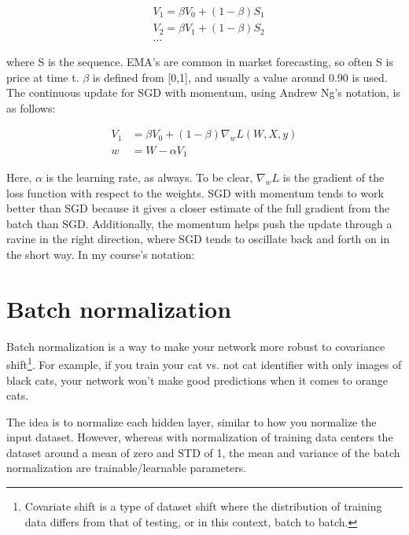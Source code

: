 \begin{align}
    & V_1 = \beta V_0 + \left(1 - \beta \right) S_1 \\
    & V_2 = \beta V_1 + \left(1 - \beta \right) S_2 \\
    & ...
\end{align}

\noindent where S is the sequence. EMA's are common in market forecasting, so often S is price at time t.
$ \beta $ is defined from [0,1], and usually a value around 0.90 is used. The continuous update for SGD with momentum, using Andrew Ng's notation, is as follows:

\begin{align}
    V_1 &= \beta V_0  + \left( 1 - \beta \right) \nabla_w L \left( W, X, y \right)\\
    w &= W - \alpha V_1
\end{align}


Here, $ \alpha $  is the learning rate, as always. To be clear, $\nabla_w L$ is the gradient of the loss function with respect to the weights. SGD with momentum tends to work better than SGD because it gives a closer estimate of the full gradient from the batch than SGD. Additionally, the momentum helps push the update through a ravine in the right direction, where SGD tends to oscillate back and forth on in the short way. In my course's notation:


\section{Batch normalization}

Batch normalization is a way to make your network more robust to covariance shift\footnote{Covariate shift is a type of dataset shift where the distribution of training data differs from that of testing, or in this context, batch to batch.}. For example, if you train your cat vs. not cat identifier with only images of black cats, your network won't make good predictions when it comes to orange cats.

The idea is to normalize each hidden layer, similar to how you normalize the input dataset. However, whereas with normalization of training data centers the dataset around a mean of zero and STD of 1, the mean and variance of the batch normalization are trainable/learnable parameters.

